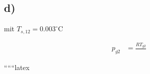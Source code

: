 

\subsection*{d)}

mit $T_{s,12} = 0.003^\circ \text{C}$

\begin{align*}
p_{g2} &= \frac{R T_{g2}}{}
\end{align*}

``````latex
